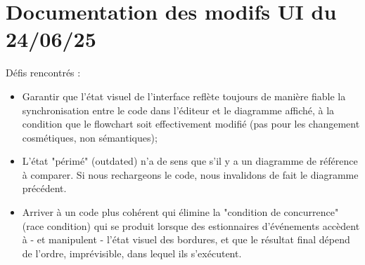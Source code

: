 \documentclass[11pt,a4paper]{article}
\begin{document}
\section{Documentation des modifs UI du 24/06/25}
Défis rencontrés : \begin{itemize}
    \item Garantir que l'état visuel de l'interface reflète toujours de manière fiable la synchronisation entre le code dans l'éditeur et le diagramme affiché, à la condition que le flowchart soit effectivement modifié (pas pour les changement cosmétiques, non sémantiques); 
    \item L'état "périmé" (outdated) n'a de sens que s'il y a un diagramme de référence à comparer. Si nous rechargeons le code, nous invalidons de fait le diagramme précédent.
    \item Arriver à un code plus cohérent qui élimine la "condition de concurrence" (race condition) qui se produit lorsque des estionnaires d'événements accèdent à - et manipulent - l'état visuel des bordures, et que le résultat final dépend de l'ordre, imprévisible, dans lequel ils s'exécutent. 
\end{itemize}
\end{document}
